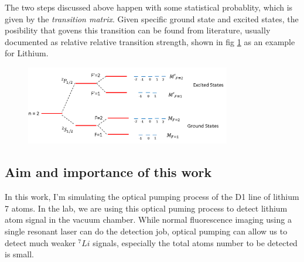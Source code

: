 \documentclass[a4paper, 10pt]{article}
\begin{document}
The two steps discussed above happen with some statistical probablity, which is given by the \textit{transition matrix}. Given specific ground state and excited states, the posibility that govens this transition can be found from literature, usually documented as relative relative transition strength, shown in fig \ref{fig1} as an example for Lithium.\\
\begin{figure}[h]
  \centering
  \caption{}
  \includegraphics[width = 0.8\textwidth]{fig1}
  \label{fig1}
\end{figure}

\subsection{Aim and importance of this work}
In this work, I'm simulating the optical pumping process of the D1 line of lithium 7 atoms. In the lab, we are using this optical puming process to detect lithium atom signal in the vacuum chamber. While normal fluorescence imaging using a single resonant laser can do the detection job, optical pumping can allow us to detect much weaker $^{7}Li$ signals, especially the total atoms number to be detected is small. \\
\end{document}

